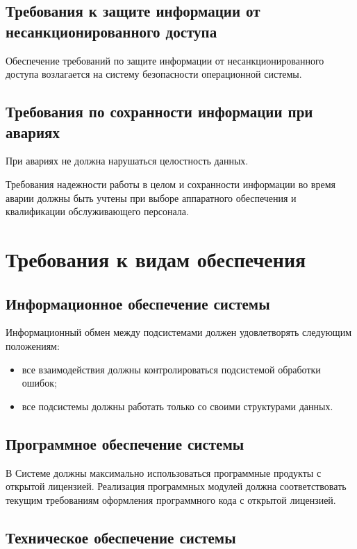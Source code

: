 \subsection{Требования к защите информации от несанкционированного доступа}
Обеспечение требований по защите информации от несанкционированного доступа возлагается на 
систему безопасности операционной системы.

\subsection{Требования по сохранности информации при авариях}
При авариях не должна нарушаться целостность данных. 

Требования надежности работы в целом и сохранности информации во время аварии должны быть 
учтены при выборе аппаратного обеспечения и квалификации обслуживающего персонала.

\section{Требования к видам обеспечения}
\subsection{Информационное обеспечение системы}
Информационный обмен между подсистемами должен удовлетворять следующим положениям:
\begin{itemize}
    \item все взаимодействия должны контролироваться подсистемой обработки ошибок;
    \item все подсистемы должны работать только со своими структурами данных.
\end{itemize}

\subsection{Программное обеспечение системы}
В Системе должны максимально использоваться программные продукты с открытой лицензией. 
Реализация программных модулей должна соответствовать текущим требованиям оформления 
программного кода с открытой лицензией.

\subsection{Техническое обеспечение системы}
